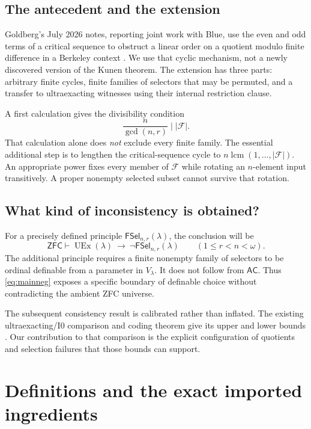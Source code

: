 \documentclass[11pt,letterpaper]{article}
\theoremstyle{definition}
\newcommand{\ZFC}{\mathsf{ZFC}}
\newcommand{\AC}{\mathsf{AC}}
\newcommand{\UEx}{\operatorname{UEx}}
\newcommand{\Izero}{\mathrm{I0}}
\newcommand{\FSel}{\mathsf{FSel}}
\newcommand{\Lcm}{\operatorname{lcm}}
\newcommand{\FF}{\mathscr F}
\begin{document}
\subsection{The antecedent and the extension}

Goldberg's July 2026 notes, reporting joint work with Blue, use the even and odd terms of a critical sequence to obstruct a linear order on a quotient modulo finite difference in a Berkeley context \cite[Remark~2.4]{cover}. We use that cyclic mechanism, not a newly discovered version of the Kunen theorem. The extension has three parts: arbitrary finite cycles, finite families of selectors that may be permuted, and a transfer to ultraexacting witnesses using their internal restriction clause.

A first calculation gives the divisibility condition
\[
 \frac{n}{\gcd(n,r)}\mid |\FF|.
\]
That calculation alone does \emph{not} exclude every finite family. The essential additional step is to lengthen the critical-sequence cycle to $n\Lcm(1,\ldots,|\FF|)$. An appropriate power fixes every member of $\FF$ while rotating an $n$-element input transitively. A proper nonempty selected subset cannot survive that rotation.

\subsection{What kind of inconsistency is obtained?}

For a precisely defined principle $\FSel_{n,r}(\lambda)$, the conclusion will be
\begin{equation}\label{eq:mainneg}
 \ZFC\vdash
 \UEx(\lambda)\ \longrightarrow\ \neg\FSel_{n,r}(\lambda)
 \qquad(1\leq r<n<\omega).
\end{equation}
The additional principle requires a finite nonempty family of selectors to be ordinal definable from a parameter in $V_\lambda$. It does not follow from $\AC$. Thus \eqref{eq:mainneg} exposes a specific boundary of definable choice without contradicting the ambient ZFC universe.

The subsequent consistency result is calibrated rather than inflated. The existing ultraexacting/$\Izero$ comparison and coding theorem give its upper and lower bounds \cite[Proposition~3.9 and Theorem~4.5]{abgl}. Our contribution to that comparison is the explicit configuration of quotients and selection failures that those bounds can support.

\section{Definitions and the exact imported ingredients}\label{sec:definitions}
\end{document}
